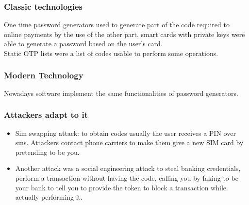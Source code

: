         \subsubsection{Classic technologies}
            One time password generators used to generate part of the code required to online payments by the use of the other part, smart cards with private keys were able to generate a password based on the user's card.\\
            Static OTP lists were a list of codes usable to perform some operations.
        \subsubsection{Modern Technology}
            Nowadays software implement the same functionalities of password generators.
        \subsubsection{Attackers adapt to it}
            \begin{itemize}
                \item Sim swapping attack: to obtain codes usually the user receives a PIN over sms. Attackers contact phone carriers to make them give a new SIM card by pretending to be you.
                \item Another attack was a social engineering attack to steal banking credentials, perform a transaction without having the code, calling you by faking to be your bank to tell you to provide the token to block a transaction while actually performing it.
            \end{itemize}
        